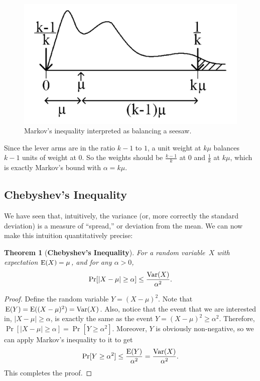 \documentclass[11pt]{article}
\def\Ex#1{{\rm E}(#1)}
\def\Var#1{{\rm Var}(#1)}
\newcounter{thm}
\newtheorem{theorem}{Theorem}[thm]
\begin{document}
\begin{figure}[h]
\centering
\includegraphics[scale=.24]{seasaw}
\caption{Markov's inequality interpreted as balancing a seesaw.}
\label{fig:seasaw}
\end{figure}

Since the lever arms are in the ratio $k-1$ to $1$, a unit weight at $k \mu$ balances $k-1$ units of weight
at $0$. So the weights should be $\frac{k-1}{k}$ at $0$ and $\frac{1}{k}$ at $k\mu$, which is exactly 
Markov's bound with $\alpha = k\mu$. 




\subsection*{Chebyshev's Inequality}

We have seen that, intuitively, the variance (or, more correctly
the standard deviation) is a measure of
``spread,'' or deviation from the mean.  We can now make
this intuition quantitatively precise:

\begin{theorem}[{\bf Chebyshev's Inequality}] For a random variable~$X$
with expectation $\Ex{X}=\mu$, and for any $\alpha>0$,  $$
   \Pr[|X-\mu|\ge\alpha] \le {{\Var{X}}\over{\alpha^2}}.  $$
\end{theorem}
\begin{proof}
Define the random variable $Y=(X-\mu)^2$.
Note that $\Ex{Y}=\Ex{(X-\mu)^2}=\Var{X}$.  Also, notice that
the event that we are interested in, $|X-\mu| \ge \alpha$, is
exactly the same as the event $Y = (X-\mu)^2 \ge \alpha^2$.
Therefore, $\Pr[|X-\mu| \ge \alpha] = \Pr[Y \ge \alpha^2]$.
Moreover, $Y$ is obviously non-negative, so we can apply Markov's inequality
to it to get $$
  \Pr[Y\ge\alpha^2] \le {{\Ex{Y}}\over{\alpha^2}} = {{\Var{X}}\over{\alpha^2}}. $$
This completes the proof.
\end{proof}
\end{document}
